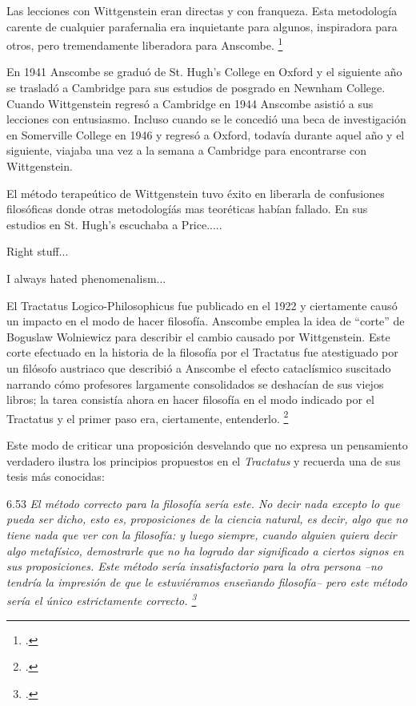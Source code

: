 \documentclass[../main.tex]{subfiles}
\begin{document}
Las lecciones con Wittgenstein eran directas y con franqueza. Esta metodología carente de cualquier parafernalia era inquietante para algunos, inspiradora para otros, pero tremendamente liberadora para Anscombe. \footcite[loc 9853 Chapter 4, Section 24, para. 5]{monk}

En 1941 Anscombe se graduó de St. Hugh's College en Oxford y el siguiente año se trasladó a Cambridge para sus estudios de posgrado en Newnham College. Cuando Wittgenstein regresó a Cambridge en 1944 Anscombe asistió a sus lecciones con entusiasmo. Incluso cuando se le concedió una beca de investigación en Somerville College en 1946 y regresó a Oxford, todavía durante aquel año y el siguiente, viajaba una vez a la semana a Cambridge para encontrarse con Wittgenstein.  

El método terapeútico de Wittgenstein tuvo éxito en liberarla de confusiones filosóficas donde otras metodologíás mas teoréticas habían fallado. En sus estudios en St. Hugh's escuchaba a Price.....

Right stuff...

I always hated phenomenalism...


El Tractatus Logico-Philosophicus fue publicado en el 1922 y ciertamente causó un impacto en el modo de hacer filosofía. Anscombe emplea la idea de ``corte'' de Boguslaw Wolniewicz para describir el cambio causado por Wittgenstein. Este corte efectuado en la historia de la filosofía por el Tractatus fue atestiguado por un filósofo austriaco que describió a Anscombe el efecto cataclísmico suscitado narrando cómo profesores largamente consolidados se deshacían de sus viejos libros; la tarea consistía ahora en hacer filosofía en el modo indicado por el Tractatus y el primer paso era, ciertamente, entenderlo. \footcite[p.181]{twocuts} 

Este modo de criticar una proposición desvelando que no expresa un pensamiento verdadero ilustra los principios propuestos en el \emph{Tractatus} y recuerda una de sus tesis más conocidas: 

6.53 \emph{El método correcto para la filosofía sería este. No decir nada excepto lo que pueda ser dicho, esto es, proposiciones de la ciencia natural, es decir, algo que no tiene nada que ver con la filosofía: y luego siempre, cuando alguien quiera decir algo metafísico, demostrarle que no ha logrado dar significado a ciertos signos en sus proposiciones. Este método sería insatisfactorio para la otra persona --no tendría la impresión de que le estuviéramos enseñando filosofía-- pero este método sería el único estrictamente correcto. \footcite[p. 107--108]{tractatus}}
\end{document}
